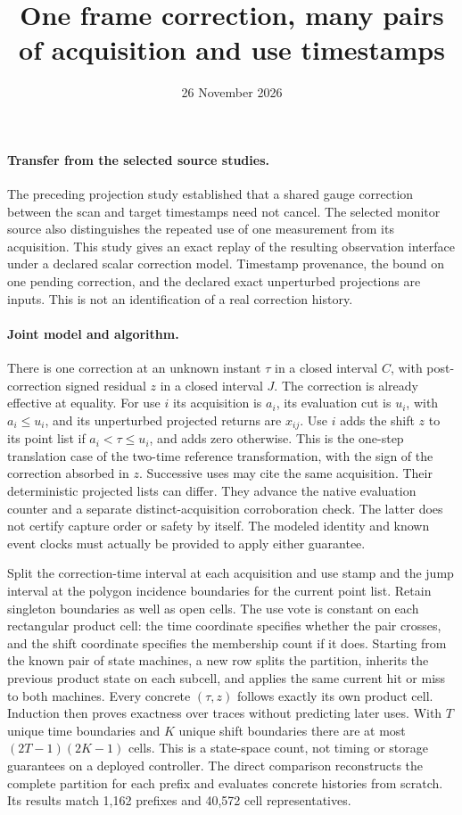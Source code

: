\documentclass[11pt]{article}
\title{One frame correction, many pairs of acquisition and use timestamps}
\date{26 November 2026}
\begin{document}
\maketitle
\paragraph{Transfer from the selected source studies.}
The preceding projection study established that a shared gauge
correction between the scan and target timestamps need not cancel.
The selected monitor source also distinguishes the repeated use of
one measurement from its acquisition. This study gives an exact replay
of the resulting observation interface under a declared scalar
correction model. Timestamp provenance, the bound on one pending
correction, and the declared exact unperturbed projections are
inputs. This is not an identification of a real correction history.

\paragraph{Joint model and algorithm.}
There is one correction at an unknown instant $\tau$ in a closed
interval $C$, with post-correction signed residual $z$ in a closed
interval $J$. The correction is already effective at equality.
For use $i$ its acquisition is $a_i$, its evaluation cut is $u_i$,
with $a_i\le u_i$, and its unperturbed projected returns are $x_{ij}$.
Use $i$ adds the shift $z$ to its point list if
$a_i<\tau\le u_i$, and adds zero otherwise. This is the one-step
translation case of the two-time reference transformation,
with the sign of the correction absorbed in $z$.
Successive uses may cite the same acquisition. Their deterministic
projected lists can differ. They advance the native evaluation
counter and a separate distinct-acquisition corroboration check.
The latter does not certify capture order or safety by itself.
The modeled identity and known event clocks must actually be
provided to apply either guarantee.

Split the correction-time interval at each acquisition and use stamp
and the jump interval at the polygon incidence boundaries for the
current point list. Retain singleton boundaries as well as open
cells. The use vote is constant on each rectangular product cell:
the time coordinate specifies whether the pair crosses, and the
shift coordinate specifies the membership count if it does. Starting
from the known pair of state machines, a new row splits the partition,
inherits the previous product state on each subcell, and applies
the same current hit or miss to both machines. Every concrete
$(\tau,z)$ follows exactly its own product cell. Induction then
proves exactness over traces without predicting later uses.
With $T$ unique time boundaries and $K$ unique shift boundaries
there are at most $(2T-1)(2K-1)$ cells. This is a state-space count,
not timing or storage guarantees on a deployed controller.
The direct comparison reconstructs the complete partition for each
prefix and evaluates concrete histories from scratch. Its results
match 1{,}162 prefixes and 40{,}572 cell representatives.
\end{document}
